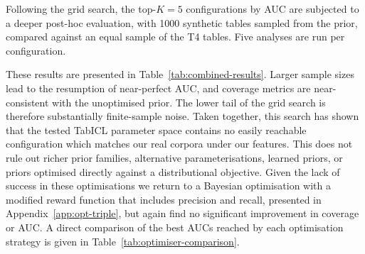 \documentclass{article}
\begin{document}
Following the grid search, the top-$K = 5$ configurations by AUC are subjected to a deeper post-hoc evaluation,  with 1000 synthetic tables sampled from the prior, compared against an equal sample of the T4 tables. Five analyses are run per configuration.

These results are presented in Table~\ref{tab:combined-results}.
Larger sample sizes lead to the resumption of near-perfect AUC, and coverage metrics are near-consistent with the unoptimised prior.
The lower tail of the grid search is therefore substantially finite-sample noise.
Taken together, this search has shown that the tested TabICL parameter space contains no easily reachable configuration which matches our real corpora under our features.
This does not rule out richer prior families, alternative parameterisations, learned priors, or priors optimised directly against a distributional objective.
Given the lack of success in these optimisations we return to a Bayesian optimisation with a modified reward function that includes precision and recall, presented in Appendix~\ref{app:opt-triple}, but again find no significant improvement in coverage or AUC.
A direct comparison of the best AUCs reached by each optimisation strategy is given in Table~\ref{tab:optimiser-comparison}.

\end{document}
